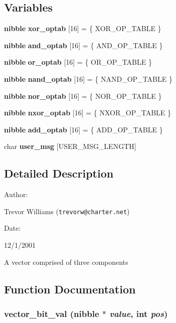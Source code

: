 \subsection*{Variables}
\begin{CompactItemize}
\item 
{\bf nibble} {\bf xor\_\-optab} [16] = \{ XOR\_\-OP\_\-TABLE \}
\item 
{\bf nibble} {\bf and\_\-optab} [16] = \{ AND\_\-OP\_\-TABLE \}
\item 
{\bf nibble} {\bf or\_\-optab} [16] = \{ OR\_\-OP\_\-TABLE \}
\item 
{\bf nibble} {\bf nand\_\-optab} [16] = \{ NAND\_\-OP\_\-TABLE \}
\item 
{\bf nibble} {\bf nor\_\-optab} [16] = \{ NOR\_\-OP\_\-TABLE \}
\item 
{\bf nibble} {\bf nxor\_\-optab} [16] = \{ NXOR\_\-OP\_\-TABLE \}
\item 
{\bf nibble} {\bf add\_\-optab} [16] = \{ ADD\_\-OP\_\-TABLE \}
\item 
char {\bf user\_\-msg} [USER\_\-MSG\_\-LENGTH]
\end{CompactItemize}


\subsection{Detailed Description}


\begin{Desc}
\item[Author: ]\par
Trevor Williams ({\tt trevorw@charter.net}) \end{Desc}
\begin{Desc}
\item[Date: ]\par
12/1/2001

 A vector comprised of three components\end{Desc}


\subsection{Function Documentation}
\subsubsection{ vector\_\-bit\_\-val ({\bf nibble} $\ast$ {\em value}, int {\em pos})}\label{vector_8c_a17}


